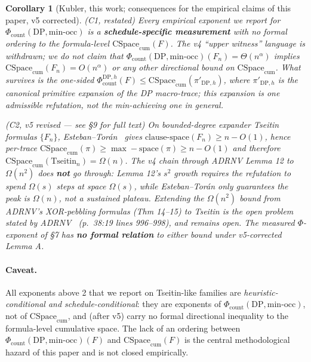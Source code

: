 \documentclass[11pt,a4paper]{article}
\newtheorem{corollary}{Corollary}
\theoremstyle{remark}
\begin{document}
\begin{corollary}[Kubler, this work; consequences for the empirical claims
of this paper, v5 corrected]
\noindent\textit{(C1, restated)} Every empirical exponent we report for
$\Phi_{\mathrm{count}}(\mathrm{DP}, \mathrm{min\text{-}occ})$ is a
\textbf{schedule-specific measurement} with no formal ordering to the
formula-level $\mathrm{CSpace}_{\mathrm{cum}}(F)$. The v4 ``upper witness''
language is withdrawn; we do \emph{not} claim that
$\Phi_{\mathrm{count}}(\mathrm{DP},\mathrm{min\text{-}occ})(F_n) =
\Theta(n^\alpha)$ implies $\mathrm{CSpace}_{\mathrm{cum}}(F_n) = O(n^\alpha)$
or any other directional bound on $\mathrm{CSpace}_{\mathrm{cum}}$. What
survives is the one-sided $\Phi_{\mathrm{count}}^{\mathrm{DP},h}(F) \le
\mathrm{CSpace}_{\mathrm{cum}}(\pi'_{\mathrm{DP},h})$, where
$\pi'_{\mathrm{DP},h}$ is the canonical primitive expansion of the DP
macro-trace; this expansion is one admissible refutation, not the
min-achieving one in general.

\begingroup\sloppy\noindent\textit{(C2, v5 revised --- see \S9 for full text)} On
bounded-degree expander Tseitin formulas $\{F_n\}$,
Esteban--Tor\'an~\cite{EstebanToran1999} gives
$\mathrm{clause\text{-}space}(F_n) \ge n - O(1)$, hence per-trace
$\mathrm{CSpace}_{\mathrm{cum}}(\pi) \ge \max\!-\!\mathrm{space}(\pi) \ge
n - O(1)$ and therefore $\mathrm{CSpace}_{\mathrm{cum}}(\mathrm{Tseitin}_n)
= \Omega(n)$. The v4 chain through ADRNV Lemma 12 to $\Omega(n^2)$ does
\textbf{not} go through: Lemma 12's $s^2$ growth requires the refutation
to spend $\Omega(s)$ steps at space $\Omega(s)$, while Esteban--Tor\'an
only guarantees the \emph{peak} is $\Omega(n)$, not a sustained
\emph{plateau}. Extending the $\Omega(n^2)$ bound from ADRNV's XOR-pebbling
formulas (Thm 14--15) to Tseitin is the open problem stated by
ADRNV~\cite{ADRNV2017} (p.~38:19 lines 996--998), and remains open. The
measured $\Phi$-exponent of \S7 has \textbf{no formal relation} to either
bound under v5-corrected Lemma A.\endgroup
\end{corollary}

\paragraph{Caveat.} All exponents above 2 that we report on Tseitin-like
families are \emph{heuristic-conditional and schedule-conditional}: they
are exponents of $\Phi_{\mathrm{count}}(\mathrm{DP}, \mathrm{min\text{-}occ})$,
not of $\mathrm{CSpace}_{\mathrm{cum}}$, and (after v5) carry no formal
directional inequality to the formula-level cumulative space. The lack of
an ordering between
$\Phi_{\mathrm{count}}(\mathrm{DP}, \mathrm{min\text{-}occ})(F)$ and
$\mathrm{CSpace}_{\mathrm{cum}}(F)$ is the central methodological hazard
of this paper and is not closed empirically.
\end{document}

